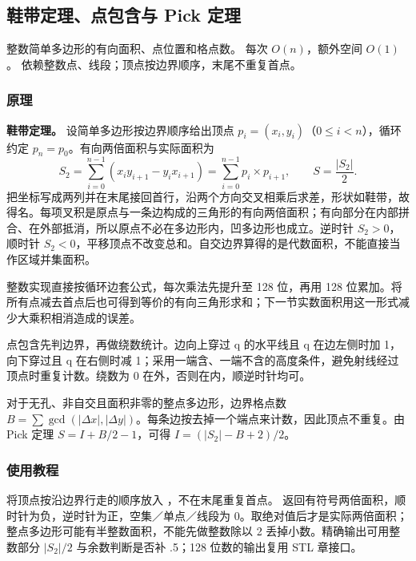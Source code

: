 \subsection{鞋带定理、点包含与 Pick 定理}
\label{geo:polygon}
\AlgorithmInfo
    {整数简单多边形的有向面积、点位置和格点数。}
    {每次 $O(n)$，额外空间 $O(1)$。}
    {依赖整数点、线段；顶点按边界顺序，末尾不重复首点。}
\subsubsection*{原理}

\textbf{鞋带定理。} 设简单多边形按边界顺序给出顶点 $p_i=(x_i,y_i)$（$0\le i<n$），循环约定 $p_n=p_0$。有向两倍面积与实际面积为
\[
 S_2=\sum_{i=0}^{n-1}(x_i y_{i+1}-y_i x_{i+1})
     =\sum_{i=0}^{n-1}p_i\times p_{i+1},\qquad
 S=\frac{|S_2|}{2}.
\]
把坐标写成两列并在末尾接回首行，沿两个方向交叉相乘后求差，形状如鞋带，故得名。每项叉积是原点与一条边构成的三角形的有向两倍面积；有向部分在内部拼合、在外部抵消，所以原点不必在多边形内，凹多边形也成立。逆时针 $S_2>0$，顺时针 $S_2<0$，平移顶点不改变总和。自交边界算得的是代数面积，不能直接当作区域并集面积。

整数实现直接按循环边套公式，每次乘法先提升至 128 位，再用 128 位累加。将所有点减去首点后也可得到等价的有向三角形求和；下一节实数面积用这一形式减少大乘积相消造成的误差。

点包含先判边界，再做绕数统计。边向上穿过 q 的水平线且 q 在边左侧时加 1，向下穿过且 q 在右侧时减 1；采用一端含、一端不含的高度条件，避免射线经过顶点时重复计数。绕数为 0 在外，否则在内，顺逆时针均可。

对于无孔、非自交且面积非零的整点多边形，边界格点数 $B=\sum\gcd(|\Delta x|,|\Delta y|)$。每条边按去掉一个端点来计数，因此顶点不重复。由 Pick 定理 $S=I+B/2-1$，可得 $I=(|S_2|-B+2)/2$。

\subsubsection*{使用教程}
将顶点按沿边界行走的顺序放入 ，不在末尾重复首点。 返回有符号两倍面积，顺时针为负，逆时针为正，空集／单点／线段为 0。取绝对值后才是实际两倍面积；整点多边形可能有半整数面积，不能先做整数除以 2 丢掉小数。精确输出可用整数部分 $|S_2|/2$ 与余数判断是否补 .5；128 位数的输出复用 STL 章接口。

